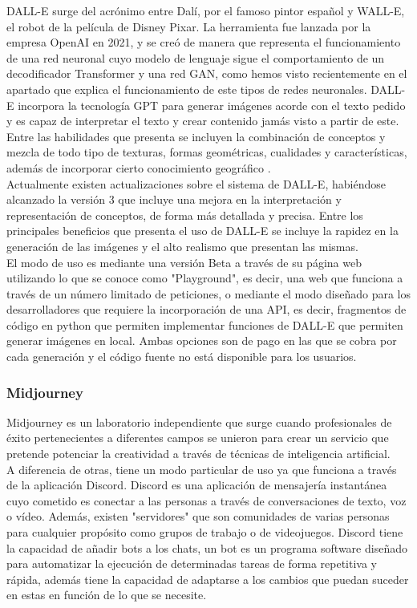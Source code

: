 DALL-E surge del acrónimo entre Dalí, por el famoso pintor español y WALL-E, el robot de la película de Disney Pixar. La herramienta fue lanzada por la empresa OpenAI en 2021, y se creó de manera que representa el funcionamiento de una red neuronal cuyo modelo de lenguaje sigue el comportamiento de un decodificador Transformer y una red GAN, como hemos visto recientemente en el apartado que explica el funcionamiento de este tipos de redes neuronales. DALL-E incorpora la tecnología GPT para generar imágenes acorde con el texto pedido y es capaz de interpretar el texto y crear contenido jamás visto a partir de este. Entre las habilidades que presenta se incluyen la combinación de conceptos y mezcla de todo tipo de texturas, formas geométricas, cualidades y características, además de incorporar cierto conocimiento geográfico \citep{dalle}. \\

Actualmente existen actualizaciones sobre el sistema de DALL-E, habiéndose alcanzado la versión 3 que incluye una mejora en la interpretación y representación de conceptos, de forma más detallada y precisa. Entre los principales beneficios que presenta el uso de DALL-E se incluye la rapidez en la generación de las imágenes y el alto realismo que presentan las mismas. \\

El modo de uso es mediante una versión Beta a través de su página web utilizando lo que se conoce como "Playground", es decir, una  web que funciona a través de un número limitado de peticiones, o mediante el modo diseñado para los desarrolladores que requiere la incorporación de una API, es decir, fragmentos de código en python que permiten implementar funciones de DALL-E que permiten generar imágenes en local. Ambas opciones son de pago en las que se cobra por cada generación y el código fuente no está disponible para los usuarios. 

\subsubsection{Midjourney}

Midjourney es un laboratorio independiente que surge cuando profesionales de éxito pertenecientes a diferentes campos se unieron para crear un servicio que pretende potenciar la creatividad a través de técnicas de inteligencia artificial. \\

A diferencia de otras, tiene un modo particular de uso ya que funciona a través de la aplicación Discord. Discord es una aplicación de mensajería instantánea cuyo cometido es conectar a las personas a través de conversaciones de texto, voz o vídeo. Además, existen "servidores" que son comunidades de varias personas para cualquier propósito como grupos de trabajo o de videojuegos. Discord tiene la capacidad de añadir bots a los chats, un bot es un programa software diseñado para automatizar la ejecución de determinadas tareas de forma repetitiva y rápida, además tiene la capacidad de adaptarse a los cambios que puedan suceder en estas en función de lo que se necesite.\\

